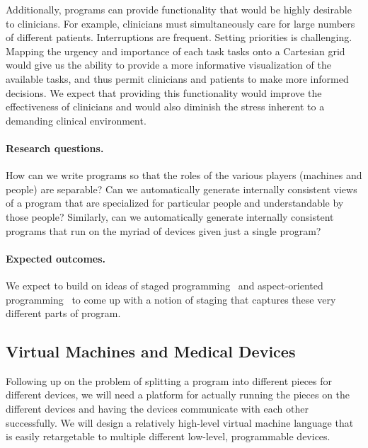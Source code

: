Additionally, \poppl{} programs can provide functionality that would
be highly desirable to clinicians. For example, clinicians must
simultaneously care for large numbers of different
patients. Interruptions are frequent. Setting priorities is
challenging. Mapping the urgency and importance of each task tasks
onto a Cartesian grid would give us the ability to provide a more
informative visualization of the available tasks, and thus permit
clinicians and patients to make more informed decisions. We expect
that providing this functionality would improve the effectiveness of
clinicians and would also diminish the stress inherent to a demanding
clinical environment.

\paragraph{Research questions.} How can we write \poppl{} programs so
that the roles of the various players (machines and people) are
separable? Can we automatically generate internally consistent views
of a \poppl{} program that are specialized for particular people and
understandable by those people? Similarly, can we automatically
generate internally consistent programs that run on the myriad of
devices given just a single \poppl{} program?

\paragraph{Expected outcomes.} 
We expect to build on ideas of staged
programming~\citep{multistageprogramming,
  efficient-program-specialization, runtime-generation-c,
  tickc:toplas} and aspect-oriented programming~\citep{aop} to come up
with a notion of staging that captures these very different parts of
\poppl{} program.

\subsection{Virtual Machines and Medical Devices}\label{sec:new-end}\label{sec:vm}

Following up on the problem of splitting a \poppl{} program into 
different pieces for different devices, we will need a platform
for actually running the pieces on the different devices and having
the devices communicate with each other successfully. We will design a
relatively high-level virtual machine language that is easily
retargetable to multiple different low-level, programmable devices.

